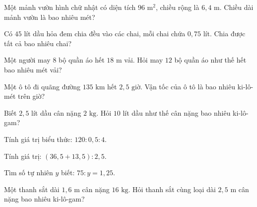 \begin{ex}
  Một mảnh vườn hình chữ nhật có diện tích $96\text{ m}^2$, chiều rộng là $6{,}4\text{ m}$. Chiều dài mảnh vườn là bao nhiêu mét?
\end{ex}

\begin{ex}
  Có $45$ lít dầu hỏa đem chia đều vào các chai, mỗi chai chứa $0{,}75$ lít. Chia được tất cả bao nhiêu chai?
\end{ex}

\begin{ex}
  Một người may $8$ bộ quần áo hết $18\text{ m}$ vải. Hỏi may $12$ bộ quần áo như thế hết bao nhiêu mét vải?
\end{ex}

\begin{ex}
  Một ô tô đi quãng đường $135\text{ km}$ hết $2{,}5\text{ giờ}$. Vận tốc của ô tô là bao nhiêu ki-lô-mét trên giờ?
\end{ex}

\begin{ex}
  Biết $2{,}5$ lít dầu cân nặng $2\text{ kg}$. Hỏi $10$ lít dầu như thế cân nặng bao nhiêu ki-lô-gam?
\end{ex}

\begin{ex}
  Tính giá trị biểu thức: $120 : 0{,}5 : 4$.
\end{ex}

\begin{ex}
  Tính giá trị: $(36{,}5 + 13{,}5) : 2{,}5$.
\end{ex}

\begin{ex}
  Tìm số tự nhiên $y$ biết: $75 : y = 1{,}25$.
\end{ex}

\begin{ex}
  Một thanh sắt dài $1{,}6\text{ m}$ cân nặng $16\text{ kg}$. Hỏi thanh sắt cùng loại dài $2{,}5\text{ m}$ cân nặng bao nhiêu ki-lô-gam?
\end{ex}

